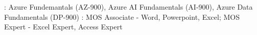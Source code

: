 

\begin{cvparagraph}
  \raggedright
  : Azure Fundemantals (AZ-900), Azure AI Fundamentals (AI-900), Azure Data Fundamentals (DP-900)
  \linebreak
  : MOS Associate - Word, Powerpoint, Excel; MOS Expert - Excel Expert, Access Expert
\end{cvparagraph}